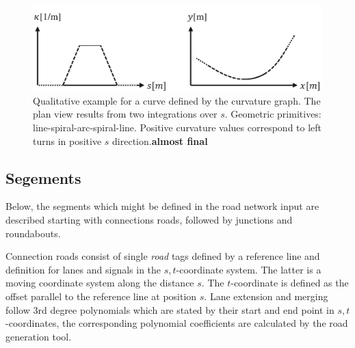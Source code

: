 \documentclass[a4paper, 10pt, conference]{ieeeconf}      %
\begin{document}
\begin{figure}%
	\centering
	\includegraphics{fig/curvGraph.pdf}
	\caption{Qualitative example for a curve defined by the curvature graph. The plan view results from two integrations over $s$. Geometric primitives: line-spiral-arc-spiral-line. Positive curvature values correspond to left turns in positive $s$ direction.\textbf{almost final}}
	\label{fig_curvGraph}
\end{figure}

\subsection{Segements}
Below, the segments which might be defined in the road network input are described starting with connections roads, followed by junctions and roundabouts.

Connection roads consist of single \textit{road} tags defined by a reference line and definition for lanes and signals in the $s,t$-coordinate system. The latter is a moving coordinate system along the distance $s$. The $t$-coordinate is defined as the offset parallel to the reference line at position $s$. Lane extension and merging follow 3rd degree polynomials which are stated by their start and end point in $s,t$-coordinates, the corresponding polynomial coefficients are calculated by the road generation tool.
\end{document}
